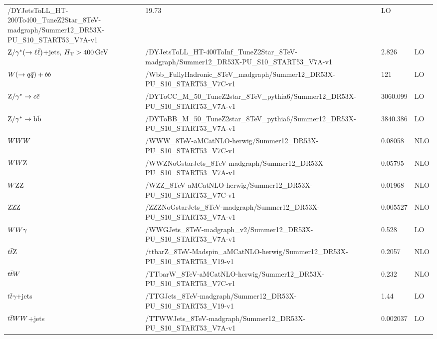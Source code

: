 \begin{table}
\begin{center}
\begin{tabular}{l l l l}
/DYJetsToLL\_HT-200To400\_TuneZ2Star\_8TeV-madgraph/Summer12\_DR53X-PU\_S10\_START53\_V7A-v1
& 19.73 & LO \\
$\mathrm{Z}/\gamma^* (\rightarrow \ell \bar{\ell})$+jets, $H_{\mathrm{T}} > 400\,\text{Ge\hspace{-.08em}V}$ &
/DYJetsToLL\_HT-400ToInf\_TuneZ2Star\_8TeV-madgraph/Summer12\_DR53X-PU\_S10\_START53\_V7A-v1
& 2.826 & LO \\
\midrule
$W(\rightarrow q\bar{q})+bb$ & 
/Wbb\_FullyHadronic\_8TeV\_madgraph/Summer12\_DR53X-PU\_S10\_START53\_V7C-v1 & 121 & LO \\
$\mathrm{Z}/\gamma^*\rightarrow c\bar{c}$ & 
/DYToCC\_M\_50\_TuneZ2star\_8TeV\_pythia6/Summer12\_DR53X-PU\_S10\_START53\_V7A-v1 & 3060.099 & LO \\
$\mathrm{Z}/\gamma^* \rightarrow \mathrm{b}\bar{\mathrm{b}}$ & 
/DYToBB\_M\_50\_TuneZ2star\_8TeV\_pythia6/Summer12\_DR53X-PU\_S10\_START53\_V7A-v1 & 3840.386 & LO \\
\midrule
$WWW$ & /WWW\_8TeV-aMCatNLO-herwig/Summer12\_DR53X-PU\_S10\_START53\_V7C-v1 & 0.08058 & NLO \\
$WW\mathrm{Z}$ & /WWZNoGstarJets\_8TeV-madgraph/Summer12\_DR53X-PU\_S10\_START53\_V7A-v1 & 0.05795 & NLO \\
$W\mathrm{Z}\mathrm{Z}$ & /WZZ\_8TeV-aMCatNLO-herwig/Summer12\_DR53X-PU\_S10\_START53\_V7C-v1 & 0.01968 & NLO \\
$\mathrm{Z}\mathrm{Z}\mathrm{Z}$ & /ZZZNoGstarJets\_8TeV-madgraph/Summer12\_DR53X-PU\_S10\_START53\_V7A-v1 & 0.005527 & NLO \\
$WW\gamma$ & /WWGJets\_8TeV-madgraph\_v2/Summer12\_DR53X-PU\_S10\_START53\_V7A-v1 & 0.528 & LO \\
\midrule
$t\bar{t}\mathrm{Z}$ & /ttbarZ\_8TeV-Madspin\_aMCatNLO-herwig/Summer12\_DR53X-PU\_S10\_START53\_V19-v1 
& 0.2057 & NLO \\
$t\bar{t}W$ & /TTbarW\_8TeV-aMCatNLO-herwig/Summer12\_DR53X-PU\_S10\_START53\_V7C-v1 & 0.232 & NLO \\
$t\bar{t}\gamma$+jets & /TTGJets\_8TeV-madgraph/Summer12\_DR53X-PU\_S10\_START53\_V19-v1 & 1.44 & LO \\
$t\bar{t}WW$+jets & /TTWWJets\_8TeV-madgraph/Summer12\_DR53X-PU\_S10\_START53\_V7A-v1 & 0.002037 & LO \\
\bottomrule
\end{tabular}
\end{center}
\label{tab:boost_mc_bg}
\end{table}

